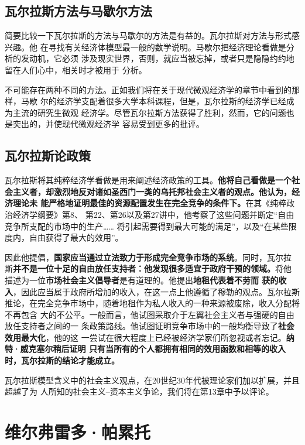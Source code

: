 \subsection{瓦尔拉斯方法与马歇尔方法}

简要比较一下瓦尔拉斯的方法与马歇尔的方法是有益的。瓦尔拉斯对方法与形式感兴趣。他
在寻找有关经济体模型最一般的数学说明。马歇尔把经济理论看做是分析的发动机，它必须
涉及现实世界，否则，就应当被忘掉，或者只是隐隐约约地留在人们心中，相关时才被用于
分析。

不可能存在两种不同的方法。正如我们将在关于现代微观经济学的章节中看到的那样，马歇
尔的经济学支配着很多大学本科课程，但是，瓦尔拉斯的经济学已经成为主流的研究生微观
经济学。尽管瓦尔拉斯方法获得了胜利，然而，它的问题也是突出的，并使现代微观经济学
容易受到更多的批评。

\subsection{瓦尔拉斯论政策}

瓦尔拉斯将其纯粹经济学看做是用来阐述经济政策的工具。\textbf{他将自己看做是一个社
会主义者，却激烈地反对诸如圣西门一类的乌托邦社会主义者的观点。他认为，经济理论未
能严格地证明最佳的资源配置发生在完全竞争的条件下。}在其《纯粹政治经济学纲要》第8、
第22、第26以及第27讲中，他考察了这些问题并断定“自由竞争所支配的市场中的生产……
将引起需要得到最大可能的满足”，以及“在某些限度内，自由获得了最大的效用”。

因此他提倡，\textbf{国家应当通过立法致力于形成完全竞争市场的系统}。同时，瓦尔拉
斯\textbf{并不是一位十足的自由放任支持者：他发现很多适宜于政府干预的领域。}将他
描述为一位\textbf{市场社会主义倡导者}是有道理的。他提出\textbf{地租代表着不劳而
获的收入}，因此应当属于政府所增加的收入，在这一点上他遵循了穆勒的观点。瓦尔拉斯
推论，在完全竞争市场中，随着地租作为私人收入的一种来源被废除，收入分配将不再包含
大的不公平。一般而言，他试图采取介于左翼社会主义者与强硬的自由放任支持者之间的一
条政策路线。他试图证明竞争市场中的一般均衡导致了\textbf{社会效用最大化}，他的这
一尝试在很大程度上已经被经济学家们所忽视或者忘记。\textbf{纳特·威克塞尔稍后证明
只有当所有的个人都拥有相同的效用函数和相等的收入时，瓦尔拉斯的结论才能成立。}

瓦尔拉斯模型含义中的社会主义观点，在20世纪30年代被理论家们加以扩展，并且超越了为
人所知的社会主义--资本主义争论，我们将在第13章中予以评论。

\section{维尔弗雷多·帕累托}

